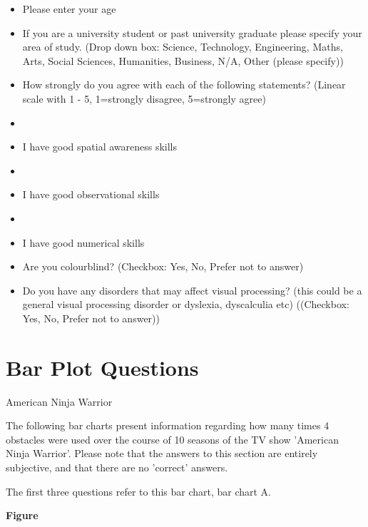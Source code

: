 \begin{itemize}
    \item Please enter your age
    
    \item If you are a university student or past university graduate please specify your area of study. (Drop down box: Science, Technology, Engineering, Maths, Arts, Social Sciences, Humanities, Business, N/A, Other (please specify))

    \item How strongly do you agree with each of the following statements? (Linear scale with 1 - 5, 1=strongly disagree, 5=strongly agree)

    \item\item I have good spatial awareness skills 
    
    \item\item I have good observational skills 
    
    \item\item I have good numerical skills 
    
    \item Are you colourblind? (Checkbox: Yes, No, Prefer not to answer)
    
    \item Do you have any disorders that may affect visual processing? (this could be a general visual processing disorder 
    or dyslexia, dyscalculia etc)
    ((Checkbox: Yes, No, Prefer not to answer))
\end{itemize}


\section{\textbf{Bar Plot Questions}}

American Ninja Warrior\newline

The following bar charts present information regarding how many times 4 obstacles were used over the course of 10 seasons of the TV show 'American Ninja Warrior'. Please note that the answers to this section are entirely subjective, and that there are no 'correct' answers.\newline


The first three questions refer to this bar chart, bar chart A.

\textbf{Figure}




